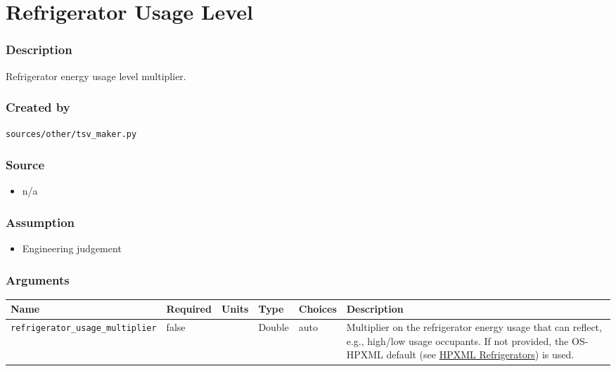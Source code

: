\section{Refrigerator Usage Level}\label{refrigerator_usage_level}

\subsubsection{Description}\label{description-135}

Refrigerator energy usage level multiplier.

\subsubsection{Created by}\label{created-by-136}

\texttt{sources/other/tsv\_maker.py}

\subsubsection{Source}\label{source-138}

\begin{itemize}
 
\item
  n/a
\end{itemize}

\subsubsection{Assumption}\label{assumption-78}

\begin{itemize}
 
\item
  Engineering judgement
\end{itemize}

\subsubsection{Arguments}\label{arguments-97}

\begin{longtable}[]{@{}llllll@{}}
\toprule\noalign{}
Name & Required & Units & Type & Choices & Description \\
\midrule\noalign{}
\endhead
\bottomrule\noalign{}
\endlastfoot
\texttt{refrigerator\_usage\_multiplier} & false & & Double & auto &
Multiplier on the refrigerator energy usage that can reflect, e.g.,
high/low usage occupants. If not provided, the OS-HPXML default (see
\href{https://openstudio-hpxml.readthedocs.io/en/v1.7.0/workflow_inputs.html\#hpxml-refrigerators}{HPXML
Refrigerators}) is used. \\
\end{longtable}


